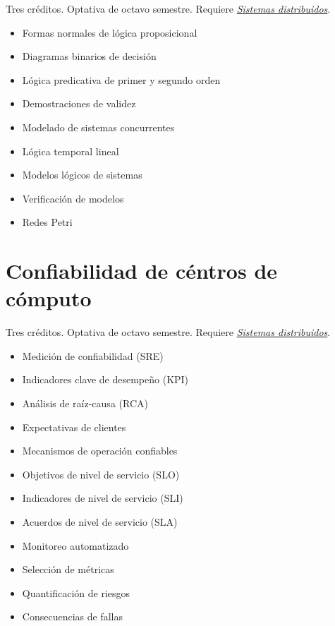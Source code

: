 \documentclass{article}
\begin{document}
\begin{multicols}{4}
Tres cr\'{e}ditos. Optativa de octavo semestre. Requiere
\hyperlink{sdi}{\em Sistemas distribuidos}.

\begin{itemize}
\item{Formas normales de l\'{o}gica proposicional}
\item{Diagramas binarios de decisi\'{o}n}
\item{L\'{o}gica predicativa de primer y segundo orden}
\item{Demostraciones de validez}
\item{Modelado de sistemas concurrentes}
\item{L\'{o}gica temporal lineal}
\item{Modelos l\'{o}gicos de sistemas}
\item{Verificaci\'{o}n de modelos}
\item{Redes Petri}
\end{itemize}


\newpage

\hypertarget{cdc}{\section*{Confiabilidad de c\'{e}ntros de c\'{o}mputo}} 

Tres cr\'{e}ditos. Optativa de octavo semestre. Requiere
\hyperlink{sdi}{\em Sistemas distribuidos}.

\begin{itemize}
\item{Medici\'{o}n de confiabilidad (SRE)}
\item{Indicadores clave de desempe\~{n}o (KPI)}
\item{An\'{a}lisis de ra\'{i}z-causa (RCA)}
\item{Expectativas de clientes}
\item{Mecanismos de operaci\'{o}n confiables}
\item{Objetivos de nivel de servicio (SLO)}
\item{Indicadores de nivel de servicio (SLI)}
\item{Acuerdos de nivel de servicio (SLA)}
\item{Monitoreo automatizado}
\item{Selecci\'{o}n de m\'{e}tricas}
\item{Quantificaci\'{o}n de riesgos}
\item{Consecuencias de fallas}
\end{itemize}

\vfill\null \columnbreak


\end{multicols}
\end{document}
